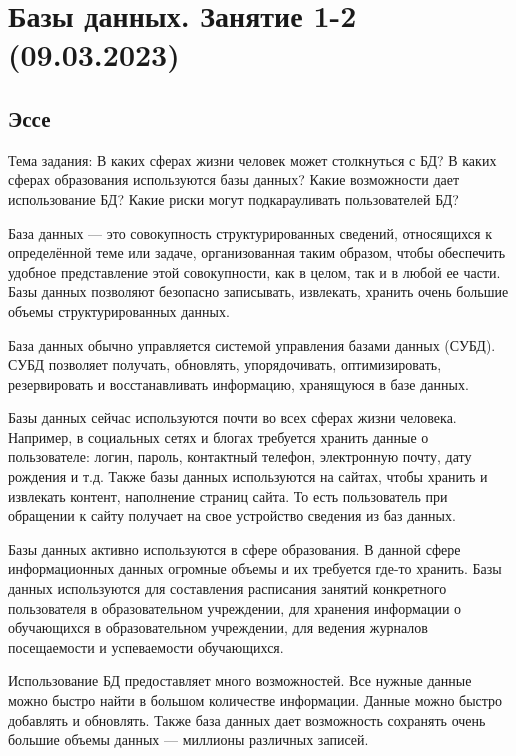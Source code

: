 \documentclass[14pt]{extreport}
\begin{document}
\pagestyle{empty} %

\pagestyle{plain} %

\chapter{Базы данных. Занятие 1-2 (09.03.2023)}

\section{Эссе}

Тема задания: В каких сферах жизни человек может столкнуться с БД? В каких сферах образования используются базы данных? Какие возможности дает использование БД? Какие риски могут подкарауливать пользователей БД?

База данных — это совокупность структурированных сведений, относящихся к определённой теме или задаче, организованная таким образом, чтобы обеспечить удобное представление этой совокупности, как в целом, так и в любой ее части. Базы данных позволяют безопасно записывать, извлекать, хранить очень большие объемы структурированных данных.

База данных обычно управляется системой управления базами данных (СУБД). СУБД позволяет получать, обновлять, упорядочивать, оптимизировать, резервировать и восстанавливать информацию, хранящуюся в базе данных.

Базы данных сейчас используются почти во всех сферах жизни человека. Например, в социальных сетях и блогах требуется хранить данные о пользователе: логин, пароль, контактный телефон, электронную почту, дату рождения и т.д. Также базы данных используются на сайтах, чтобы хранить и извлекать контент, наполнение страниц сайта. То есть пользователь при обращении к сайту получает на свое устройство сведения из баз данных.

Базы данных активно используются в сфере образования. В данной сфере информационных данных огромные объемы и их требуется где-то хранить. Базы данных используются для составления расписания занятий конкретного пользователя в образовательном учреждении, для хранения информации о обучающихся в образовательном учреждении, для ведения журналов посещаемости и успеваемости обучающихся.

Использование БД предоставляет много возможностей. Все нужные данные можно быстро найти в большом количестве информации. Данные можно быстро добавлять и обновлять. Также база данных дает возможность сохранять очень большие объемы данных — миллионы различных записей.
\end{document}
